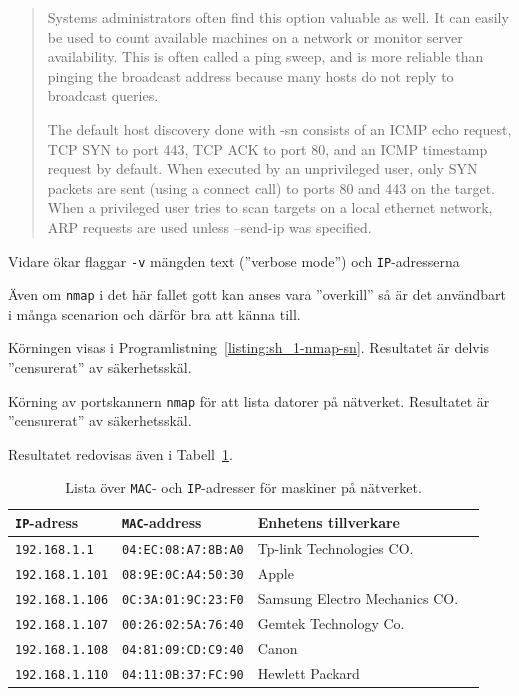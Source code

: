 \begin{quotation}
Systems administrators often find this option valuable as well. It can easily
be used to count available machines on a network or monitor server
availability. This is often called a ping sweep, and is more reliable than
pinging the broadcast address because many hosts do not reply to broadcast
queries.

The default host discovery done with -sn consists of an ICMP echo request, TCP
SYN to port 443, TCP ACK to port 80, and an ICMP timestamp request by default.
When executed by an unprivileged user, only SYN packets are sent (using a
connect call) to ports 80 and 443 on the target. When a privileged user tries
to scan targets on a local ethernet network, ARP requests are used unless
--send-ip was specified. 
\end{quotation}

Vidare ökar flaggar \texttt{-v} mängden text (''verbose mode'') och 
\texttt{IP}-adresserna 


Även om \texttt{nmap} i det här fallet gott kan anses vara ''overkill'' så är
det användbart i många scenarion och därför bra att känna till.

Körningen visas i Programlistning~\ref{listing:sh_1-nmap-sn}.  Resultatet är
delvis ''censurerat'' av säkerhetsskäl.

\begin{listing}[H]
  \caption{Körning av portskannern \texttt{nmap} för att lista datorer på
           nätverket. Resultatet är ''censurerat'' av säkerhetsskäl.}
  \label{listing:sh_1-nmap-sn}
\end{listing}


Resultatet redovisas även i Tabell~\ref{table:network}.

\begin{table}[]
  \centering
  \caption{Lista över \texttt{MAC}- och \texttt{IP}-adresser för maskiner på
           nätverket.}
  \label{table:network}
  \begin{tabular}{@{}llll@{}}
    \toprule
    \texttt{IP}-adress     & \texttt{MAC}-address       & Enhetens tillverkare          \\ \midrule
    \texttt{192.168.1.1}   & \texttt{04:EC:08:A7:8B:A0} & Tp-link Technologies CO.      \\
    \texttt{192.168.1.101} & \texttt{08:9E:0C:A4:50:30} & Apple                         \\
    \texttt{192.168.1.106} & \texttt{0C:3A:01:9C:23:F0} & Samsung Electro Mechanics CO. \\
    \texttt{192.168.1.107} & \texttt{00:26:02:5A:76:40} & Gemtek Technology Co.         \\
    \texttt{192.168.1.108} & \texttt{04:81:09:CD:C9:40} & Canon                         \\
    \texttt{192.168.1.110} & \texttt{04:11:0B:37:FC:90} & Hewlett Packard               \\ \bottomrule
  \end{tabular}
\end{table}



